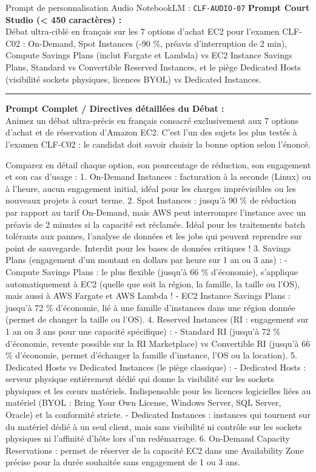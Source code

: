 \documentclass[11pt,a4paper]{article}
\begin{document}
\begin{promptbox}{Prompt de personnalisation Audio NotebookLM : \texttt{CLF-AUDIO-07}}
\textbf{Prompt Court Studio (< 450 caractères) :}\\
Débat ultra-ciblé en français sur les 7 options d'achat EC2 pour l'examen CLF-C02 : On-Demand, Spot Instances (-90 \%, préavis d'interruption de 2 min), Compute Savings Plans (inclut Fargate et Lambda) vs EC2 Instance Savings Plans, Standard vs Convertible Reserved Instances, et le piège Dedicated Hosts (visibilité sockets physiques, licences BYOL) vs Dedicated Instances.

\medskip\hrule\medskip
\textbf{Prompt Complet / Directives détaillées du Débat :}\\
Animez un débat ultra-précis en français consacré exclusivement aux 7 options d'achat et de réservation d'Amazon EC2. C'est l'un des sujets les plus testés à l'examen CLF-C02 : le candidat doit savoir choisir la bonne option selon l'énoncé.

Comparez en détail chaque option, son pourcentage de réduction, son engagement et son cas d'usage :
1. On-Demand Instances : facturation à la seconde (Linux) ou à l'heure, aucun engagement initial, idéal pour les charges imprévisibles ou les nouveaux projets à court terme.
2. Spot Instances : jusqu'à 90 \% de réduction par rapport au tarif On-Demand, mais AWS peut interrompre l'instance avec un préavis de 2 minutes si la capacité est réclamée. Idéal pour les traitements batch tolérants aux pannes, l'analyse de données et les jobs qui peuvent reprendre sur point de sauvegarde. Interdit pour les bases de données critiques !
3. Savings Plans (engagement d'un montant en dollars par heure sur 1 an ou 3 ans) :
- Compute Savings Plans : le plus flexible (jusqu'à 66 \% d'économie), s'applique automatiquement à EC2 (quelle que soit la région, la famille, la taille ou l'OS), mais aussi à AWS Fargate et AWS Lambda !
- EC2 Instance Savings Plans : jusqu'à 72 \% d'économie, lié à une famille d'instances dans une région donnée (permet de changer la taille ou l'OS).
4. Reserved Instances (RI : engagement sur 1 an ou 3 ans pour une capacité spécifique) :
- Standard RI (jusqu'à 72 \% d'économie, revente possible sur la RI Marketplace) vs Convertible RI (jusqu'à 66 \% d'économie, permet d'échanger la famille d'instance, l'OS ou la location).
5. Dedicated Hosts vs Dedicated Instances (le piège classique) :
- Dedicated Hosts : serveur physique entièrement dédié qui donne la visibilité sur les sockets physiques et les cœurs matériels. Indispensable pour les licences logicielles liées au matériel (BYOL : Bring Your Own License, Windows Server, SQL Server, Oracle) et la conformité stricte.
- Dedicated Instances : instances qui tournent sur du matériel dédié à un seul client, mais sans visibilité ni contrôle sur les sockets physiques ni l'affinité d'hôte lors d'un redémarrage.
6. On-Demand Capacity Reservations : permet de réserver de la capacité EC2 dans une Availability Zone précise pour la durée souhaitée sans engagement de 1 ou 3 ans.
\end{promptbox}
\end{document}

